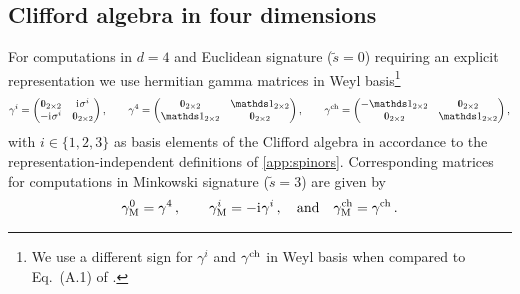 \subsection{Clifford algebra in four dimensions}\label{app:clifford4}
For computations in $d=4$ and Euclidean signature ($\tilde{s}=0$) requiring an explicit representation we use hermitian gamma matrices in Weyl basis\footnote{%
	We use a different sign for $\gamma^i$ and $\gamma^{\mathrm{ch}}$ in Weyl basis when compared to Eq.~(A.1) of .%
}
\begin{align}
	\gamma^i=\begin{pmatrix}
		\Zero_{2\times 2}& \iu \sigma^i\\
		-\iu \sigma^i &\Zero_{2\times 2}
	\end{pmatrix},\qquad%
	\gamma^4=\begin{pmatrix}
		\Zero_{2\times 2}& \Id_{2\times 2}\\
		\Id_{2\times 2} &\Zero_{2\times 2}
	\end{pmatrix},\qquad%
	\gammach=\begin{pmatrix}
		-\Id_{2\times 2}& \Zero_{2\times 2}\\
		\Zero_{2\times 2} &\Id_{2\times 2}
	\end{pmatrix},\label{eq:gammaWeyl4}
\end{align}
with ${i\in\{1,2,3\}}$ as basis elements of the Clifford algebra in accordance to the representation-independent definitions of \cref{app:spinors}.
Corresponding matrices for computations in Minkowski signature ($\tilde{s}=3$) are given by
\begin{align}
	\gamma_\mathrm{M}^0 = \gamma^4 \, ,\qquad \gamma_\mathrm{M}^i = -\mathrm{i}\mkern1mu \gamma^i  \, ,\quad\text{and}\quad \gamma^{\mathrm{ch}}_\mathrm{M}=\gamma^{\mathrm{ch}} \, .
\end{align}